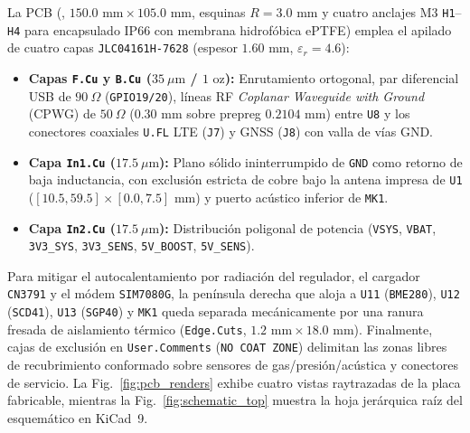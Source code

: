 \documentclass[conference]{IEEEtran}
\begin{document}
La PCB (, $150.0\text{ mm} \times 105.0\text{ mm}$, esquinas $R=3.0\text{ mm}$ y cuatro anclajes M3 \texttt{H1}--\texttt{H4} para encapsulado IP66 con membrana hidrofóbica ePTFE) emplea el apilado de cuatro capas \texttt{JLC04161H-7628} (espesor $1.60\text{ mm}$, $\varepsilon_r = 4.6$):
\begin{itemize}
    \item \textbf{Capas \texttt{F.Cu} y \texttt{B.Cu} ($35\ \mu\text{m}$ / $1\text{ oz}$):} Enrutamiento ortogonal, par diferencial USB de $90\ \Omega$ (\texttt{GPIO19/20}), líneas RF \emph{Coplanar Waveguide with Ground} (CPWG) de $50\ \Omega$ ($0.30\text{ mm}$ sobre prepreg $0.2104\text{ mm}$) entre \texttt{U8} y los conectores coaxiales \texttt{U.FL} LTE (\texttt{J7}) y GNSS (\texttt{J8}) con valla de vías GND.
    \item \textbf{Capa \texttt{In1.Cu} ($17.5\ \mu\text{m}$):} Plano sólido ininterrumpido de \texttt{GND} como retorno de baja inductancia, con exclusión estricta de cobre bajo la antena impresa de \texttt{U1} ($[10.5,59.5]\times[0.0,7.5]\text{ mm}$) y puerto acústico inferior de \texttt{MK1}.
    \item \textbf{Capa \texttt{In2.Cu} ($17.5\ \mu\text{m}$):} Distribución poligonal de potencia (\texttt{VSYS}, \texttt{VBAT}, \texttt{3V3\_SYS}, \texttt{3V3\_SENS}, \texttt{5V\_BOOST}, \texttt{5V\_SENS}).
\end{itemize}

Para mitigar el autocalentamiento por radiación del regulador, el cargador \texttt{CN3791} y el módem \texttt{SIM7080G}, la península derecha que aloja a \texttt{U11} (\texttt{BME280}), \texttt{U12} (\texttt{SCD41}), \texttt{U13} (\texttt{SGP40}) y \texttt{MK1} queda separada mecánicamente por una ranura fresada de aislamiento térmico (\texttt{Edge.Cuts}, $1.2\text{ mm} \times 18.0\text{ mm}$). Finalmente, cajas de exclusión en \texttt{User.Comments} (\texttt{NO COAT ZONE}) delimitan las zonas libres de recubrimiento conformado sobre sensores de gas/presión/acústica y conectores de servicio. La Fig.~\ref{fig:pcb_renders} exhibe cuatro vistas raytrazadas de la placa fabricable, mientras la Fig.~\ref{fig:schematic_top} muestra la hoja jerárquica raíz del esquemático en KiCad~9.
\end{document}
